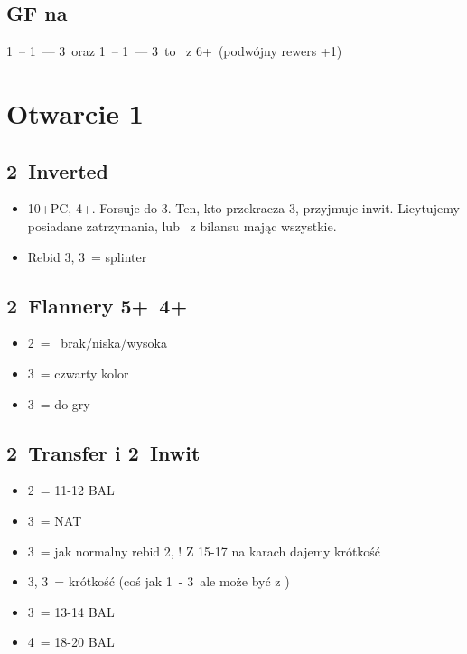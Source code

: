 \documentclass[12pt, a4paper]{article}
\begin{document}
\subsection*{GF na \clubs}
1\clubs\ -- 1\hearts\ --- 3\diams\ oraz 1\clubs\ -- 1\spades\ --- 3\diams\ to \gf\ z 6+\clubs\ (podwójny rewers +1)


\pagebreak
\section{Otwarcie 1\diams}
\subsection{2\diams\ Inverted}
\begin{itemize}
    \item 10+PC, 4+\diams. Forsuje do 3\diams. Ten, kto przekracza 3\diams, przyjmuje inwit.
    Licytujemy posiadane zatrzymania, lub \nt\ z bilansu mając wszystkie.
    \item Rebid 3\hearts, 3\spades\ = splinter
\end{itemize}

\subsection*{2\hearts\ Flannery 5+\spades\ 4+\hearts}
\begin{itemize}
    \item 2\nt\ = \lsf\ brak/niska/wysoka \exq
    \item 3\clubs\ = czwarty kolor \gf
    \item 3\diams\ = do gry
\end{itemize}

\subsection*{2\spades\ Transfer i 2\ntx\ Inwit}
\begin{itemize}
    \item 2\nt\ = 11-12 BAL
    \item 3\clubs\ = NAT \nf
    \item 3\diams\ = jak normalny rebid 2\diams, \nf! Z 15-17 na karach dajemy krótkość
    \item 3\hearts, 3\spades\ = krótkość (coś jak 1\nt\ - 3\hearts\ ale może być z \diams)
    \item 3\nt\ = 13-14 BAL
    \item 4\nt\ = 18-20 BAL
\end{itemize}
\end{document}
